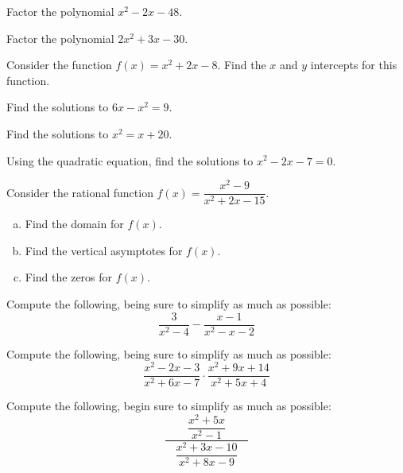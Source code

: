 \documentclass[12pt,letterpaper]{exam}
\begin{document}
\begin{questions}
\newpage
\question[5] Factor the polynomial $x^2 - 2x - 48$. 





\newpage
\question[5] Factor the polynomial $2x^2 + 3x - 30$. 





\newpage
\question[5] Consider the function $f(x)= x^2 + 2x - 8$. Find the $x$ and $y$ intercepts for this function. 





\newpage
\question[5] Find the solutions to $6x - x^2= 9$. 





\newpage
\question[5] Find the solutions to $x^2= x + 20$. 





\newpage
\question[5] Using the quadratic equation, find the solutions to $x^2 - 2x - 7= 0$. 





\newpage
\question[10] Consider the rational function $f(x)= \dfrac{x^2 - 9}{x^2 + 2x - 15}$. 
\begin{enumerate}[(a)]
\item Find the domain for $f(x)$. 
\item Find the vertical asymptotes for $f(x)$. 
\item Find the zeros for $f(x)$. 
\end{enumerate}





\newpage
\question[5] Compute the following, being sure to simplify as much as possible: 
	\[
	\dfrac{3}{x^2 - 4} - \dfrac{x - 1}{x^2 - x - 2}
	\]





\newpage
\question[5] Compute the following, being sure to simplify as much as possible:
	\[
	\dfrac{x^2 - 2x - 3}{x^2 + 6x - 7} \cdot \dfrac{x^2 + 9x + 14}{x^2 + 5x + 4} 
	\]





\newpage
\question[5] Compute the following, begin sure to simplify as much as possible:
	\[
	\dfrac{\phantom{--}\dfrac{x^2 + 5x}{x^2 - 1}\phantom{--}}{\dfrac{x^2 + 3x - 10}{x^2 + 8x - 9}}
	\]






\end{questions}
\end{document}

